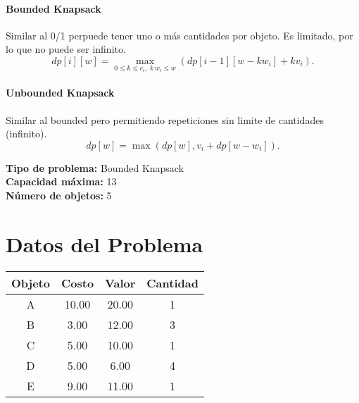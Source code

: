 \documentclass{article}
\begin{document}
\paragraph{Bounded Knapsack} Similar al 0/1 perpuede tener uno o más cantidades por objeto. Es limitado, por lo que no puede ser infinito.
\[
dp[i][w] = 
\max_{0 \leq k \leq c_i,\; k\,w_i \leq w} \left( dp[i-1][w - k w_i] + k v_i \right).
\]

\paragraph{Unbounded Knapsack} Similar al bounded pero permitiendo repeticiones sin limite de cantidades (infinito).
\[
dp[w] = \max ( dp[w], v_i + dp[w - w_i] ).
\]

\thispagestyle{empty}
\newpage
\textbf{Tipo de problema:} Bounded Knapsack\\
\textbf{Capacidad máxima:} 13\\
\textbf{Número de objetos:} 5\\

\section*{Datos del Problema}
\begin{tabular}{|c|c|c|c|}
\hline
Objeto & Costo & Valor & Cantidad \\
\hline
A & 10.00 & 20.00 & 1 \\
B & 3.00 & 12.00 & 3 \\
C & 5.00 & 10.00 & 1 \\
D & 5.00 & 6.00 & 4 \\
E & 9.00 & 11.00 & 1 \\
\hline
\end{tabular}
\end{document}
